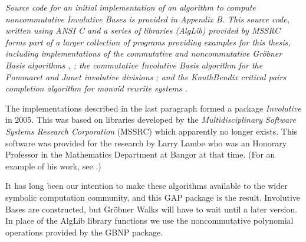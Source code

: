 \documentclass[a4paper,11pt]{report}
\begin{document}
{{ \emph{Source code for an initial implementation of an algorithm to compute
noncommutative Involutive Bases is provided in Appendix B. This source code,
written using ANSI C and a series of libraries (AlgLib) provided by MSSRC
forms part of a larger collection of programs providing examples for this
thesis, including implementations of the commutative and noncommutative
Gr{\"o}bner Basis algorithms \cite{buchberger}, \cite{mora}; the commutative Involutive Basis algorithm for the Pommaret and Janet
involutive divisions \cite{yuyu}; and the Knuth\texttt{}Bendix critical pairs completion algorithm
for monoid rewrite systems \cite{knuth-bendix}.} 

 The implementations described in the last paragraph formed a package \emph{Involutive} in 2005. This was based on libraries developed by the \emph{Multidisciplinary Software Systems Research Corporation} (MSSRC) which apparently no longer exists. This software was provided for the
research by Larry Lambe who was an Honorary Professor in the Mathematics
Department at Bangor at that time. (For an example of his work, see \cite{lambe-radford}.) 

 It has long been our intention to make these algorithms available to the wider
symbolic computation community, and this \textsf{GAP} package is the result. Involutive Bases are constructed, but Gr{\"o}bner Walks
will have to wait until a later version. In place of the AlgLib library
functions we use the noncommutative polynomial operations provided by the \textsf{GBNP} \cite{GBNP} package. }

 }

  
\end{document}
